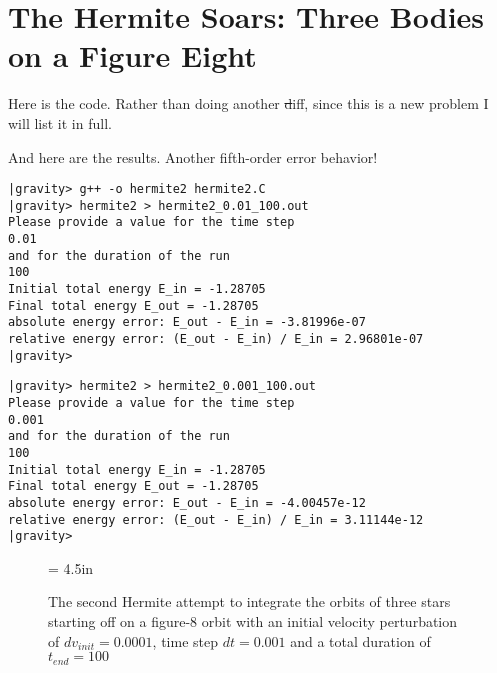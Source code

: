\cba

\section{The Hermite Soars: Three Bodies on a Figure Eight}

\abc

\bob
Here is the code.  Rather than doing another {\st diff}, since this is
a new problem I will list it in full.

\cba


\abc

\bob
And here are the results.  Another fifth-order error behavior!

\cba

\begin{small}
\begin{verbatim}
|gravity> g++ -o hermite2 hermite2.C
|gravity> hermite2 > hermite2_0.01_100.out
Please provide a value for the time step
0.01
and for the duration of the run
100
Initial total energy E_in = -1.28705
Final total energy E_out = -1.28705
absolute energy error: E_out - E_in = -3.81996e-07
relative energy error: (E_out - E_in) / E_in = 2.96801e-07
|gravity>
\end{verbatim}
\end{small}

\begin{small}
\begin{verbatim}
|gravity> hermite2 > hermite2_0.001_100.out
Please provide a value for the time step
0.001
and for the duration of the run
100
Initial total energy E_in = -1.28705
Final total energy E_out = -1.28705
absolute energy error: E_out - E_in = -4.00457e-12
relative energy error: (E_out - E_in) / E_in = 3.11144e-12
|gravity>
\end{verbatim}
\end{small}

\begin{figure}[htb]
\begin{center}
\epsfxsize = 4.5in
\caption[Three stars on a figure-8 orbit, Hermite, $dv_{init}=0.0001$,
$dt = 0.001$, $t_{end} = 100$]
{The second Hermite attempt to integrate the orbits of three stars
starting off on a figure-8 orbit with an initial velocity perturbation of 
$dv_{init}=0.0001$, time step $dt = 0.001$ and a total duration of
$t_{end} = 100$}
\label{fig:hermite2-0.001-100}
\end{center}
\end{figure}

